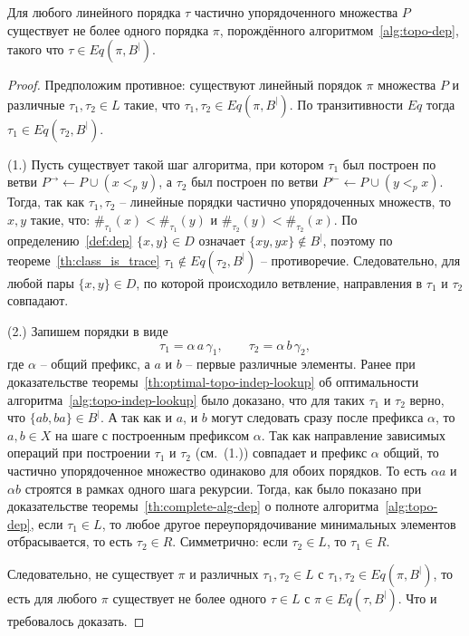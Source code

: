 \begin{theorem}
  Для любого линейного порядка $\tau$ частично упорядоченного
  множества $P$ существует не более одного порядка $\pi$,
  порождённого алгоритмом~\ref{alg:topo-dep}, такого что
  $\tau \in Eq(\pi, B^{|})$.
\end{theorem}

\begin{proof}
  Предположим противное: существуют линейный порядок $\pi$ множества $P$
  и различные $\tau_1,\tau_2\in L$ такие, что $\tau_1,\tau_2\in Eq(\pi,B^{|})$.
  По транзитивности $Eq$ тогда $\tau_1\in Eq(\tau_2,B^{|})$.

  (1.) Пусть существует такой шаг алгоритма, при котором $\tau_1$ был
  построен по ветви $P^{\rightarrow} \gets P \cup (x <_{p} y)$, а
  $\tau_2$ был построен по
  ветви $P^{\leftarrow} \gets P \cup (y <_{p} x)$.
  Тогда, так как $\tau_1, \tau_2$ -- линейные порядки частично
  упорядоченных множеств, то $x, y$ такие, что:
  $\#_{\tau_1}(x) < \#_{\tau_1}(y)$ и $\#_{\tau_2}(y) < \#_{\tau_2}(x)$.
  По определению~\ref{def:dep} $\{x,y\}\in D$ означает
  $\{xy,yx\} \notin B^{|}$, поэтому по
  теореме~\ref{th:class_is_trace} $\tau_1\notin Eq(\tau_2,B^{|})$ --
  противоречие. Следовательно, для любой пары $\{x,y\}\in D$, по которой
  происходило ветвление, направления в $\tau_1$ и $\tau_2$ совпадают.

  (2.)
  Запишем порядки в виде
  \[
    \tau_1 = \alpha\, a\, \gamma_1,
    \qquad
    \tau_2 = \alpha\, b\, \gamma_2,
  \]
  где $\alpha$ -- общий префикс, а $a$ и $b$ -- первые различные
  элементы.
  Ранее при доказательстве теоремы~\ref{th:optimal-topo-indep-lookup}
  об оптимальности алгоритма~\ref{alg:topo-indep-lookup} было
  доказано, что для таких $\tau_1$ и $\tau_2$ верно, что $\{ab,
  ba\} \in B^|$. А так как и $a$, и $b$ могут следовать сразу после
  префикса $\alpha$, то $a, b \in X$ на шаге с построенным префиксом $\alpha$.
  Так как направление зависимых операций при построении $\tau_1$ и
  $\tau_2$ (см.~(1.)) совпадает и префикс $\alpha$ общий, то частично
  упорядоченное множество одинаково
  для обоих порядков.
  То есть $\alpha a$ и $\alpha b$ строятся в рамках одного шага рекурсии.
  Тогда, как было показано при доказательстве
  теоремы~\ref{th:complete-alg-dep} о полноте
  алгоритма~\ref{alg:topo-dep}, если $\tau_1 \in L$, то любое другое
  переупорядочивание минимальных элементов отбрасывается, то есть
  $\tau_2 \in R$.
  Симметрично: если $\tau_2 \in L$, то $\tau_1 \in R$.

  Следовательно, не существует $\pi$ и различных $\tau_1,\tau_2\in L$
  с $\tau_1,\tau_2\in Eq(\pi,B^{|})$, то есть для любого $\pi$
  существует не более одного $\tau\in L$ с $\pi\in Eq(\tau,B^{|})$.
  Что и требовалось доказать.
\end{proof}

